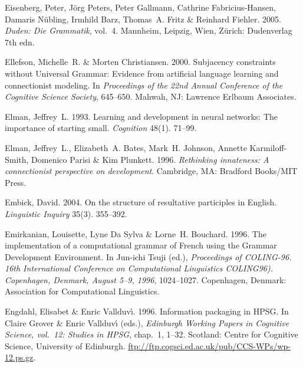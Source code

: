 \begin{thebibliography}{1420}
Eisenberg, Peter, J{\"o}rg Peters, Peter Gallmann, Cathrine Fabricius-Hansen,
  Damaris N{\"u}bling, Irmhild Barz, Thomas~A. Fritz \& Reinhard Fiehler. 2005.
\newblock \emph{{Duden: Die Grammatik}}, vol.~4.
\newblock Mannheim, Leipzig, Wien, Z{\"u}rich: Dudenverlag 7th edn.

Ellefson, Michelle~R. \& Morten Christiansen. 2000.
\newblock Subjacency constraints without {Universal Grammar}: {Evidence} from
  artificial language learning and connectionist modeling.
\newblock In \emph{Proceedings of the {22nd Annual Conference of the Cognitive
  Science Society}}, 645--650. Mahwah, NJ: Lawrence Erlbaum Associates.

Elman, Jeffrey~L. 1993.
\newblock Learning and development in neural networks: {The} importance of
  starting small.
\newblock \emph{Cognition} 48(1). 71--99.

Elman, Jeffrey~L., Elizabeth~A. Bates, Mark~H. Johnson, Annette
  Karmiloff-Smith, Domenico Parisi \& Kim Plunkett. 1996.
\newblock \emph{Rethinking innateness: {A} connectionist perspective on
  development}.
\newblock Cambridge, MA: Bradford Books/MIT Press.

Embick, David. 2004.
\newblock On the structure of resultative participles in {English}.
\newblock \emph{Linguistic Inquiry} 35(3). 355--392.

Emirkanian, Louisette, Lyne {Da Sylva} \& Lorne~H. Bouchard. 1996.
\newblock The implementation of a computational grammar of {French} using the
  {Grammar Development Environment}.
\newblock In {Jun-ichi} Tsuji (ed.), \emph{Proceedings of {COLING-96. 16th
  International Conference on Computational Linguistics COLING96). Copenhagen,
  Denmark, August 5--9, 1996}}, 1024--1027. Copenhagen, Denmark: Association
  for Computational Linguistics.

Engdahl, Elisabet \& Enric Vallduv{\'\i}. 1996.
\newblock Information packaging in {HPSG}.
\newblock In Claire Grover \& Enric Vallduv{\'\i} (eds.), \emph{Edinburgh
  {Working Papers in Cognitive Science}, vol.~12: {Studies} in {HPSG}},
  chap.~1, 1--32. Scotland: Centre for Cognitive Science, University of
  Edinburgh.
\newblock \urlprefix\url{ftp://ftp.cogsci.ed.ac.uk/pub/CCS-WPs/wp-12.ps.gz}.


\end{thebibliography}
